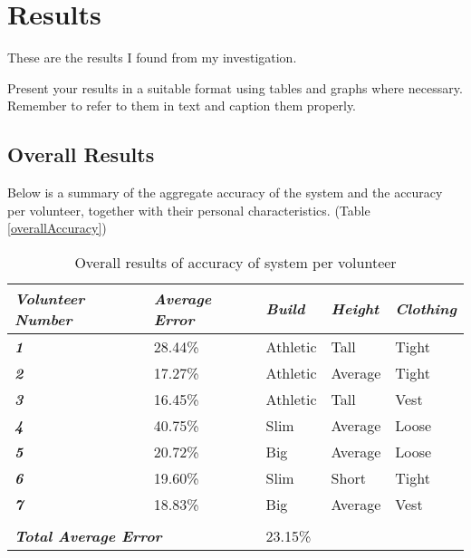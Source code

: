 \chapter{Results}
These are the results I found from my investigation.

Present your results in a suitable format using tables and graphs where necessary. Remember to refer
to them in text and caption them properly.


\section{Overall Results}
 Below is a summary of the aggregate accuracy of the system and the accuracy per volunteer, together with their personal characteristics. (Table \ref{overallAccuracy})
 
 \begin{table}[htbp]
 	\centering
 	\caption{Overall results of accuracy of system per volunteer}
 	\begin{tabularx}{\textwidth}{|XX|XXX|}
 		\toprule
 		\multicolumn{1}{|X|}{\textit{\textbf{Volunteer Number}}} & \textit{\textbf{Average Error}} & \multicolumn{1}{X|}{\textit{\textbf{Build}}} & \multicolumn{1}{X|}{\textit{\textbf{Height}}} & \textit{\textbf{Clothing}} \\
 		\midrule
 		\multicolumn{1}{|X|}{\textit{\textbf{1}}} & 28.44\% & \multicolumn{1}{X|}{Athletic} & \multicolumn{1}{X|}{Tall} & Tight \\
 		\midrule
 		\multicolumn{1}{|X|}{\textit{\textbf{2}}} & 17.27\% & \multicolumn{1}{X|}{Athletic} & \multicolumn{1}{X|}{Average} & Tight \\
 		\midrule
 		\multicolumn{1}{|X|}{\textit{\textbf{3}}} & 16.45\% & \multicolumn{1}{X|}{Athletic} & \multicolumn{1}{X|}{Tall} & Vest \\
 		\midrule
 		\multicolumn{1}{|X|}{\textit{\textbf{4}}} & 40.75\% & \multicolumn{1}{X|}{Slim} & \multicolumn{1}{X|}{Average} & Loose \\
 		\midrule
 		\multicolumn{1}{|X|}{\textit{\textbf{5}}} & 20.72\% & \multicolumn{1}{X|}{Big} & \multicolumn{1}{X|}{Average} & Loose \\
 		\midrule
 		\multicolumn{1}{|X|}{\textit{\textbf{6}}} & 19.60\% & \multicolumn{1}{X|}{Slim} & \multicolumn{1}{X|}{Short} & Tight \\
 		\midrule
 		\multicolumn{1}{|X|}{\textit{\textbf{7}}} & 18.83\% & \multicolumn{1}{X|}{Big} & \multicolumn{1}{X|}{Average} & Vest \\
 		\midrule
 		\multicolumn{5}{|X|}{} \\
 		\midrule
 		\multicolumn{2}{|X|}{\textit{\textbf{Total Average Error}}} & \multicolumn{3}{X|}{23.15\%} \\
 		\bottomrule
 	\end{tabularx}%
 	\label{tab:overallAccuracy}%
 \end{table}%
 

